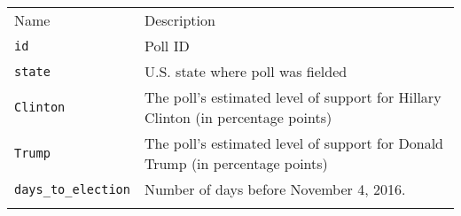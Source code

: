 \documentclass[]{article}
\begin{document}
\begin{longtable}[c]{@{}ll@{}}
\toprule\addlinespace
\begin{minipage}[b]{0.24\columnwidth}\raggedright
Name
\end{minipage} & \begin{minipage}[b]{0.70\columnwidth}\raggedright
Description
\end{minipage}
\\\addlinespace
\midrule\endhead
\begin{minipage}[t]{0.24\columnwidth}\raggedright
\texttt{id}
\end{minipage} & \begin{minipage}[t]{0.70\columnwidth}\raggedright
Poll ID
\end{minipage}
\\\addlinespace
\begin{minipage}[t]{0.24\columnwidth}\raggedright
\texttt{state}
\end{minipage} & \begin{minipage}[t]{0.70\columnwidth}\raggedright
U.S. state where poll was fielded
\end{minipage}
\\\addlinespace
\begin{minipage}[t]{0.24\columnwidth}\raggedright
\texttt{Clinton}
\end{minipage} & \begin{minipage}[t]{0.70\columnwidth}\raggedright
The poll's estimated level of support for Hillary Clinton (in percentage
points)
\end{minipage}
\\\addlinespace
\begin{minipage}[t]{0.24\columnwidth}\raggedright
\texttt{Trump}
\end{minipage} & \begin{minipage}[t]{0.70\columnwidth}\raggedright
The poll's estimated level of support for Donald Trump (in percentage
points)
\end{minipage}
\\\addlinespace
\begin{minipage}[t]{0.24\columnwidth}\raggedright
\texttt{days\_to\_election}
\end{minipage} & \begin{minipage}[t]{0.70\columnwidth}\raggedright
Number of days before November 4, 2016.
\end{minipage}
\\\addlinespace
\begin{minipage}[t]{0.24\columnwidth}\raggedright

\end{minipage}
\end{longtable}
\end{document}
